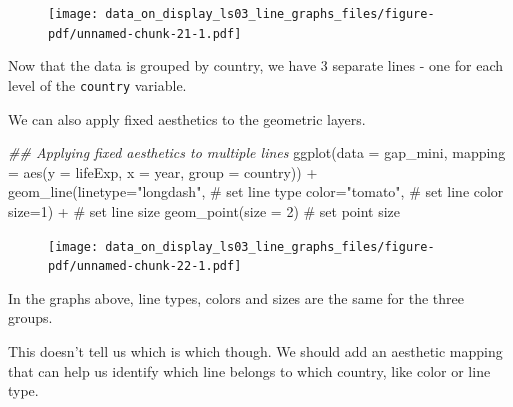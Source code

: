 \documentclass[
  letterpaper,
  DIV=11,
  numbers=noendperiod]{scrreprt}
\newenvironment{Shaded}{\begin{snugshade}}{\end{snugshade}}
\newcommand{\AttributeTok}[1]{\textcolor[rgb]{0.40,0.45,0.13}{#1}}
\newcommand{\CommentTok}[1]{\textcolor[rgb]{0.37,0.37,0.37}{#1}}
\newcommand{\DecValTok}[1]{\textcolor[rgb]{0.68,0.00,0.00}{#1}}
\newcommand{\DocumentationTok}[1]{\textcolor[rgb]{0.37,0.37,0.37}{\textit{#1}}}
\newcommand{\FunctionTok}[1]{\textcolor[rgb]{0.28,0.35,0.67}{#1}}
\newcommand{\NormalTok}[1]{\textcolor[rgb]{0.00,0.23,0.31}{#1}}
\newcommand{\SpecialCharTok}[1]{\textcolor[rgb]{0.37,0.37,0.37}{#1}}
\newcommand{\StringTok}[1]{\textcolor[rgb]{0.13,0.47,0.30}{#1}}
\begin{document}
\begin{figure}[H]

{\centering \texttt{[image: data\_on\_display\_ls03\_line\_graphs\_files/figure-pdf/unnamed-chunk-21-1.pdf]}

}

\end{figure}

Now that the data is grouped by country, we have 3 separate lines - one
for each level of the \texttt{country} variable.

We can also apply fixed aesthetics to the geometric layers.

\begin{Shaded}
\begin{Highlighting}[]
\DocumentationTok{\#\# Applying fixed aesthetics to multiple lines}
\FunctionTok{ggplot}\NormalTok{(}\AttributeTok{data =}\NormalTok{ gap\_mini, }
       \AttributeTok{mapping =} \FunctionTok{aes}\NormalTok{(}\AttributeTok{y =}\NormalTok{ lifeExp,}
                     \AttributeTok{x =}\NormalTok{ year, }
                     \AttributeTok{group =}\NormalTok{ country)) }\SpecialCharTok{+}
  \FunctionTok{geom\_line}\NormalTok{(}\AttributeTok{linetype=}\StringTok{"longdash"}\NormalTok{,        }\CommentTok{\# set line type}
            \AttributeTok{color=}\StringTok{"tomato"}\NormalTok{,             }\CommentTok{\# set line color}
            \AttributeTok{size=}\DecValTok{1}\NormalTok{) }\SpecialCharTok{+}                   \CommentTok{\# set line size}
  \FunctionTok{geom\_point}\NormalTok{(}\AttributeTok{size =} \DecValTok{2}\NormalTok{)                  }\CommentTok{\# set point size}
\end{Highlighting}
\end{Shaded}

\begin{figure}[H]

{\centering \texttt{[image: data\_on\_display\_ls03\_line\_graphs\_files/figure-pdf/unnamed-chunk-22-1.pdf]}

}

\end{figure}

In the graphs above, line types, colors and sizes are the same for the
three groups.

This doesn't tell us which is which though. We should add an aesthetic
mapping that can help us identify which line belongs to which country,
like color or line type.
\end{document}
